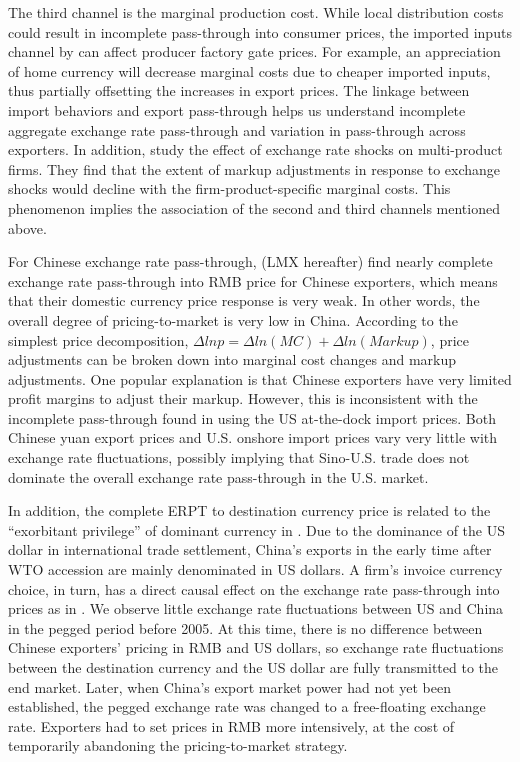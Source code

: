 The third channel is the marginal production cost.  While local distribution costs could result in incomplete pass-through into consumer prices, the imported inputs channel by \cite{aik2014} can affect producer factory gate prices. For example, an appreciation of home currency will decrease marginal costs due to cheaper imported inputs, thus partially offsetting the increases in export prices. The linkage between import behaviors and export pass-through helps us understand incomplete aggregate exchange rate pass-through and variation in pass-through across exporters. In addition, \cite{chatterjee2013} study the effect of exchange rate shocks on multi-product firms. They find that the extent of markup adjustments in response to exchange shocks would decline with the firm-product-specific marginal costs. This phenomenon implies the association of the second and third channels mentioned above.

For Chinese exchange rate pass-through, \cite{lmx2015} (LMX hereafter) find nearly complete exchange rate pass-through into RMB price for Chinese exporters, which means that their domestic currency price response is very weak. In other words, the overall degree of pricing-to-market is very low in China. According to the simplest price decomposition, $\Delta ln p = \Delta ln(MC) + \Delta ln(Markup)$, price adjustments can be broken down into marginal cost changes and markup adjustments. One popular explanation is that Chinese exporters have very limited profit margins to adjust their markup. However, this is inconsistent with the incomplete pass-through found in \cite{gopinath2008} using the US at-the-dock import prices. Both Chinese yuan export prices and U.S. onshore import prices vary very little with exchange rate fluctuations, possibly implying that Sino-U.S. trade does not dominate the overall exchange rate pass-through in the U.S. market. 

In addition, the complete ERPT to destination currency price is related to the “exorbitant privilege” of dominant currency in \cite{gopinath-stein2021}. Due to the dominance of the US dollar in international trade settlement, China's exports in the early time after WTO accession are mainly denominated in US dollars. A firm’s invoice currency choice, in turn, has a direct causal effect on the exchange rate pass-through into prices as in \cite{aik2022}. We observe little exchange rate fluctuations between US and China in the pegged period before 2005. At this time, there is no difference between Chinese exporters' pricing in RMB and US dollars, so exchange rate fluctuations between the destination currency and the US dollar are fully transmitted to the end market. Later, when China’s export market power had not yet been established, the pegged exchange rate was changed to a free-floating exchange rate. Exporters had to set prices in RMB more intensively, at the cost of temporarily abandoning the pricing-to-market strategy.

